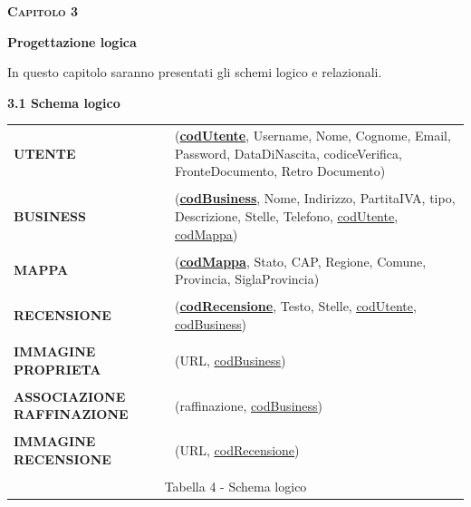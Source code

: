 \documentclass[a4paper,12pt]{article}
\def\doubleunderline#1{\underline{\underline{#1}}}
\begin{document}
\newpage\null{}\setcounter{page}{10}
\begin{flushleft}
\vspace*{+1cm}
\Large\textsc{\bf Capitolo 3}
\vspace*{+1cm}

\begingroup
\fontsize{30pt}{12pt}\selectfont\bf{Progettazione logica}
\endgroup
\vspace*{+1cm}

\normalsize{
In questo capitolo saranno presentati gli schemi logico e relazionali.
}

\vspace*{+1cm}
{\bf 3.1 Schema logico}
\vspace*{+0.5cm}

\begin{table}[htbp]
\begin{tabular}[c]{ p{3.5cm}  p{11.5cm} }
\setlength{\extrarowheight}{20pt}
{\bf UTENTE}
&({\bf \underline{codUtente}}, Username, Nome, Cognome, Email, Password, DataDiNascita, 
codiceVerifica, FronteDocumento, Retro Documento)
\\
\\
{\bf BUSINESS}
&({\bf \underline{codBusiness}}, Nome, Indirizzo, PartitaIVA, tipo, Descrizione, Stelle, Telefono,
\doubleunderline{codUtente}, \doubleunderline{codMappa})
\\
\\
{\bf MAPPA}
&({\bf \underline{codMappa}}, Stato, CAP, Regione, Comune, Provincia, SiglaProvincia)
\\
\\
{\bf RECENSIONE}
&({\bf \underline{codRecensione}}, Testo, Stelle, \doubleunderline{codUtente}, \doubleunderline{codBusiness})
\\
\\
{\bf IMMAGINE
PROPRIETA}
&(URL, \doubleunderline{codBusiness})
\\
\\
{\bf ASSOCIAZIONE
RAFFINAZIONE}
&(raffinazione, \doubleunderline{codBusiness})
\\
\\
{\bf IMMAGINE
RECENSIONE}
&(URL, \doubleunderline{codRecensione})
\\
\\
\multicolumn{2}{c}{\footnotesize{\normalsize Tabella 4 - Schema logico}}
\end{tabular}
\end{table}
\end{flushleft}
\newpage
\end{document}

